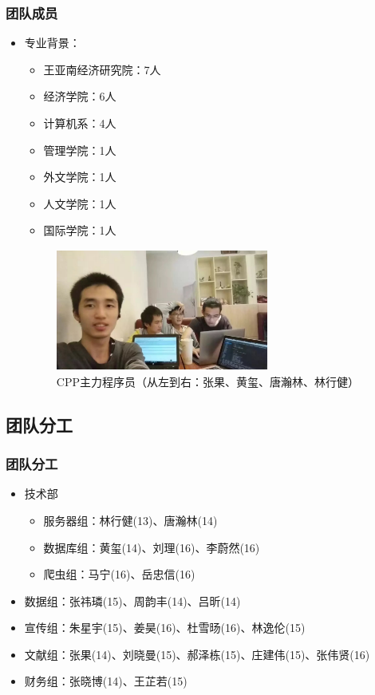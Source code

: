 \documentclass{beamer}
\begin{document}
  \begin{frame}[allowframebreaks]
  \frametitle{团队成员}
  \begin{itemize}
  \item 专业背景：
  \begin{itemize}
    \item 王亚南经济研究院：7人
    \item 经济学院：6人
    \item 计算机系：4人
    \item 管理学院：1人
    \item 外文学院：1人
    \item 人文学院：1人
    \item 国际学院：1人
  \end{itemize} 
  \framebreak
  \begin{figure}
  \begin{center}
  \includegraphics[width=7cm,height=4cm]{cpp-coders.jpg} 
  \caption{CPP主力程序员（从左到右：张果、黄玺、唐瀚林、林行健）}
  \end{center}
  \end{figure}
\end{itemize}
\end{frame}

\subsection{团队分工}
\begin{frame}
\frametitle{团队分工}
\begin{itemize}
  \item 技术部
  \begin{itemize}
    \item 服务器组：林行健(13)、唐瀚林(14)
    \item 数据库组：黄玺(14)、刘理(16)、李蔚然(16)
    \item 爬虫组：马宁(16)、岳忠信(16)
  \end{itemize}
  \item 数据组：张祎璘(15)、周韵丰(14)、吕昕(14)
  \item 宣传组：朱星宇(15)、姜昊(16)、杜雪旸(16)、林逸伦(15)
  \item 文献组：张果(14)、刘晓曼(15)、郝泽栋(15)、庄建伟(15)、张伟贤(16)
  \item 财务组：张晓博(14)、王芷若(15)
\end{itemize}

\end{frame}
\end{document}
